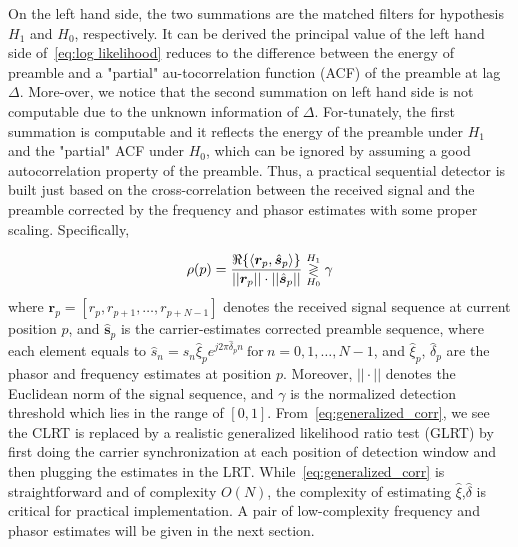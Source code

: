 On the left hand side, the two summations are the matched filters for hypothesis $H_1$
and $H_0$, respectively. It can be derived the principal value of the left hand side of~\eqref{eq:log likelihood}
reduces to the difference between the energy of preamble and a "partial" au-tocorrelation function (ACF)
of the preamble at lag $\Delta$. More-over, we notice that the second summation on left hand side
is not computable due to the unknown information of $\Delta$. For-tunately,
the first summation is computable and it reflects the energy of the preamble
under $H_1$ and the "partial" ACF under $H_0$, which can be ignored by assuming a
good autocorrelation property of the preamble. 
Thus, a practical sequential detector is built just based on the
cross-correlation between the received signal
and the preamble corrected by the frequency and phasor estimates with some proper scaling. Specifically,

\begin{equation}
  \label{eq:generalized_corr}
  \rho(p)=
  \frac{\Re\{\langle
    \bm{r}_{p},\hat{\bm{s}}_{p}\rangle\}}
  {||\bm{r}_{p}||\cdot||\hat{\bm{s}}_{p}||} \mathrel{\mathop\gtrless\limits^{H_1}_{H_0}} \gamma
\end{equation}
where $\bm{r}_{p}{=}[r_{p},r_{p+1},\ldots,r_{p+N-1}]$ denotes the received signal sequence at
current position $p$, and $\hat{\bm{s}}_{p}$ is the carrier-estimates corrected preamble sequence, where each element equals to
$\hat{s}_{n}=s_n\hat{\xi}_{p}e^{j2\pi\hat{\delta}_{p}n}~\text{for}~n=0,1,\ldots,N-1$, and $\hat{\xi}_{p}$, $\hat{\delta}_{p}$
are the phasor and frequency estimates at position $p$. Moreover, $||\cdot||$ denotes the Euclidean norm of the signal sequence,
and $\gamma$ is the normalized detection threshold which lies in the range of $[0,1]$. 
From~\eqref{eq:generalized_corr}, we see the CLRT
is replaced by a realistic generalized likelihood ratio test (GLRT) by first
doing the carrier synchronization at each position of detection window and 
then plugging the estimates in the LRT. While~\eqref{eq:generalized_corr}
is straightforward and of complexity $O(N)$, the complexity of estimating $\hat{\xi}$,$\hat{\delta}$
is critical for practical implementation. 
A pair of low-complexity frequency and phasor estimates will be given in the next section.



